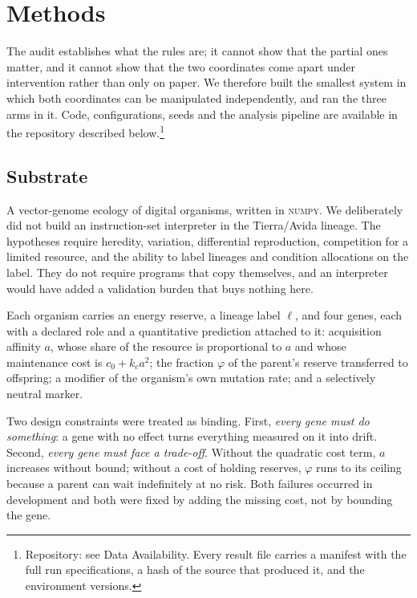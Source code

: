 \section{Methods}

The audit establishes what the rules are; it cannot show that the partial ones
matter, and it cannot show that the two coordinates come apart under
intervention rather than only on paper. We therefore built the smallest system
in which both coordinates can be manipulated independently, and ran the three
arms in it. Code, configurations, seeds and the analysis pipeline are
available in the repository described below.\footnote{Repository: see Data
Availability. Every result file carries a
manifest with the full run specifications, a hash of the source that produced
it, and the environment versions.}

\subsection{Substrate}

A vector-genome ecology of digital organisms, written in \textsc{numpy}. We
deliberately did not build an instruction-set interpreter in the Tierra/Avida
lineage. The hypotheses require heredity, variation, differential reproduction,
competition for a limited resource, and the ability to label lineages and
condition allocations on the label. They do not require programs that copy
themselves, and an interpreter would have added a validation burden that buys
nothing here.

Each organism carries an energy reserve, a lineage label $\ell$, and four
genes, each with a declared role and a quantitative prediction attached to it:
acquisition affinity $a$, whose share of the resource is proportional to $a$
and whose maintenance cost is $c_0 + k_c a^2$; the fraction $\varphi$ of the
parent's reserve transferred to offspring; a modifier of the organism's own
mutation rate; and a selectively neutral marker.

Two design constraints were treated as binding. First, \emph{every gene must do
something}: a gene with no effect turns everything measured on it into drift.
Second, \emph{every gene must face a trade-off}. Without the quadratic cost
term, $a$ increases without bound; without a cost of holding reserves,
$\varphi$ runs to its ceiling because a parent can wait indefinitely at no
risk. Both failures occurred in development and both were fixed by adding the
missing cost, not by bounding the gene.

